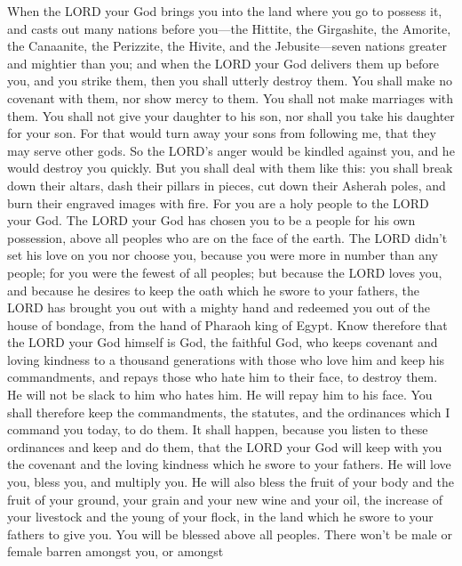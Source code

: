  When the LORD your God brings you into the land where you
go to possess it, and casts out many nations before you---the Hittite,
the Girgashite, the Amorite, the Canaanite, the Perizzite, the Hivite,
and the Jebusite---seven nations greater and mightier than you;
 and when the LORD your God delivers them up before you, and
you strike them, then you shall utterly destroy them. You shall make no
covenant with them, nor show mercy to them.  You shall not
make marriages with them. You shall not give your daughter to his son,
nor shall you take his daughter for your son.  For that
would turn away your sons from following me, that they may serve other
gods. So the LORD's anger would be kindled against you, and he would
destroy you quickly.  But you shall deal with them like
this: you shall break down their altars, dash their pillars in pieces,
cut down their Asherah poles, and burn their engraved images with fire.
 For you are a holy people to the LORD your God. The LORD
your God has chosen you to be a people for his own possession, above all
peoples who are on the face of the earth.  The LORD didn't
set his love on you nor choose you, because you were more in number than
any people; for you were the fewest of all peoples;  but
because the LORD loves you, and because he desires to keep the oath
which he swore to your fathers, the LORD has brought you out with a
mighty hand and redeemed you out of the house of bondage, from the hand
of Pharaoh king of Egypt.  Know therefore that the LORD your
God himself is God, the faithful God, who keeps covenant and loving
kindness to a thousand generations with those who love him and keep his
commandments,  and repays those who hate him to their face,
to destroy them. He will not be slack to him who hates him. He will
repay him to his face.  You shall therefore keep the
commandments, the statutes, and the ordinances which I command you
today, to do them.  It shall happen, because you listen to
these ordinances and keep and do them, that the LORD your God will keep
with you the covenant and the loving kindness which he swore to your
fathers.  He will love you, bless you, and multiply you. He
will also bless the fruit of your body and the fruit of your ground,
your grain and your new wine and your oil, the increase of your
livestock and the young of your flock, in the land which he swore to
your fathers to give you.  You will be blessed above all
peoples. There won't be male or female barren amongst you, or amongst
